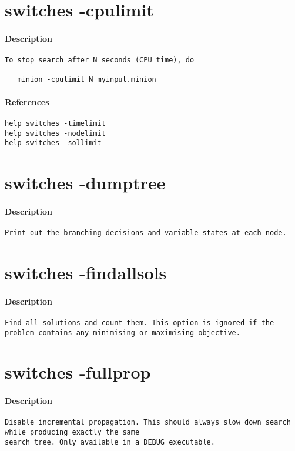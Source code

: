\section{switches -cpulimit}
\paragraph{Description}
{\footnotesize
\begin{verbatim}
To stop search after N seconds (CPU time), do

   minion -cpulimit N myinput.minion
\end{verbatim}
}
\paragraph{References}
{\footnotesize
\begin{verbatim}
help switches -timelimit
help switches -nodelimit
help switches -sollimit
\end{verbatim}
}
\section{switches -dumptree}
\paragraph{Description}
{\footnotesize
\begin{verbatim}
Print out the branching decisions and variable states at each node.
\end{verbatim}
}
\section{switches -findallsols}
\paragraph{Description}
{\footnotesize
\begin{verbatim}
Find all solutions and count them. This option is ignored if the
problem contains any minimising or maximising objective.
\end{verbatim}
}
\section{switches -fullprop}
\paragraph{Description}
{\footnotesize
\begin{verbatim}
Disable incremental propagation. This should always slow down search while producing exactly the same
search tree. Only available in a DEBUG executable.
\end{verbatim}
}
